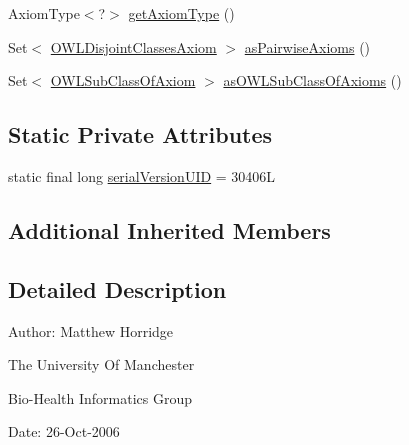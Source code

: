 \begin{DoxyCompactItemize}
\item 
Axiom\-Type$<$?$>$ \hyperlink{classuk_1_1ac_1_1manchester_1_1cs_1_1owl_1_1owlapi_1_1_o_w_l_disjoint_classes_axiom_impl_aaa52e32a2b9f336cc501b0e8dd391abf}{get\-Axiom\-Type} ()
\item 
Set$<$ \hyperlink{interfaceorg_1_1semanticweb_1_1owlapi_1_1model_1_1_o_w_l_disjoint_classes_axiom}{O\-W\-L\-Disjoint\-Classes\-Axiom} $>$ \hyperlink{classuk_1_1ac_1_1manchester_1_1cs_1_1owl_1_1owlapi_1_1_o_w_l_disjoint_classes_axiom_impl_ae60f0eaa94f3603622cdf1c0279659b4}{as\-Pairwise\-Axioms} ()
\item 
Set$<$ \hyperlink{interfaceorg_1_1semanticweb_1_1owlapi_1_1model_1_1_o_w_l_sub_class_of_axiom}{O\-W\-L\-Sub\-Class\-Of\-Axiom} $>$ \hyperlink{classuk_1_1ac_1_1manchester_1_1cs_1_1owl_1_1owlapi_1_1_o_w_l_disjoint_classes_axiom_impl_a7a91c1123cab5910c18e9aa9292f9eb4}{as\-O\-W\-L\-Sub\-Class\-Of\-Axioms} ()
\end{DoxyCompactItemize}
\subsection*{Static Private Attributes}
\begin{DoxyCompactItemize}
\item 
static final long \hyperlink{classuk_1_1ac_1_1manchester_1_1cs_1_1owl_1_1owlapi_1_1_o_w_l_disjoint_classes_axiom_impl_aa1003fee4d74ed6484b392ba1ee0d8ca}{serial\-Version\-U\-I\-D} = 30406\-L
\end{DoxyCompactItemize}
\subsection*{Additional Inherited Members}


\subsection{Detailed Description}
Author\-: Matthew Horridge\par
 The University Of Manchester\par
 Bio-\/\-Health Informatics Group\par
 Date\-: 26-\/\-Oct-\/2006\par
\par
 


